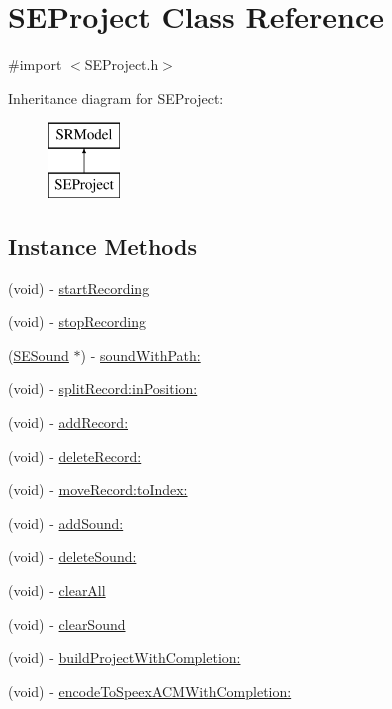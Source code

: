 \hypertarget{interface_s_e_project}{\section{S\-E\-Project Class Reference}
\label{interface_s_e_project}
}


{\ttfamily \#import $<$S\-E\-Project.\-h$>$}

Inheritance diagram for S\-E\-Project\-:\begin{figure}[H]
\begin{center}
\leavevmode
\includegraphics[height=2.000000cm]{interface_s_e_project}
\end{center}
\end{figure}
\subsection*{Instance Methods}
\begin{DoxyCompactItemize}
\item 
(void) -\/ \hyperlink{interface_s_e_project_a6ca188c1c950307dff57f2fc1c4fcf96}{start\-Recording}
\item 
(void) -\/ \hyperlink{interface_s_e_project_ad296156ecf208ebd921e4199ba5d7638}{stop\-Recording}
\item 
(\hyperlink{interface_s_e_sound}{S\-E\-Sound} $\ast$) -\/ \hyperlink{interface_s_e_project_a6302bcd0db48539227ab526ec63d5d17}{sound\-With\-Path\-:}
\item 
(void) -\/ \hyperlink{interface_s_e_project_ae818f074881388ea74dafe9f1e04eed4}{split\-Record\-:in\-Position\-:}
\item 
(void) -\/ \hyperlink{interface_s_e_project_a215f3b65a6214364b1c91a3e868e326f}{add\-Record\-:}
\item 
(void) -\/ \hyperlink{interface_s_e_project_a766d033976c34b25c714664a936431c0}{delete\-Record\-:}
\item 
(void) -\/ \hyperlink{interface_s_e_project_a6df677b3addadd2b57c7cb476817b3f0}{move\-Record\-:to\-Index\-:}
\item 
(void) -\/ \hyperlink{interface_s_e_project_ad9f28e0c9d86a533a5c7e0c1703a0558}{add\-Sound\-:}
\item 
(void) -\/ \hyperlink{interface_s_e_project_a992ccb90006e8c02bb577e5bfea6a183}{delete\-Sound\-:}
\item 
(void) -\/ \hyperlink{interface_s_e_project_acb9a770163ce30c942c58239d8edcbed}{clear\-All}
\item 
(void) -\/ \hyperlink{interface_s_e_project_affc4a30ee29146d6ec9531dac79b1360}{clear\-Sound}
\item 
(void) -\/ \hyperlink{interface_s_e_project_ae7481d7c7bbe90e3c68a7c2561da3c95}{build\-Project\-With\-Completion\-:}
\item 
(void) -\/ \hyperlink{interface_s_e_project_a81cc0a725ae6a4b86cad1670c34820c9}{encode\-To\-Speex\-A\-C\-M\-With\-Completion\-:}
\end{DoxyCompactItemize}
